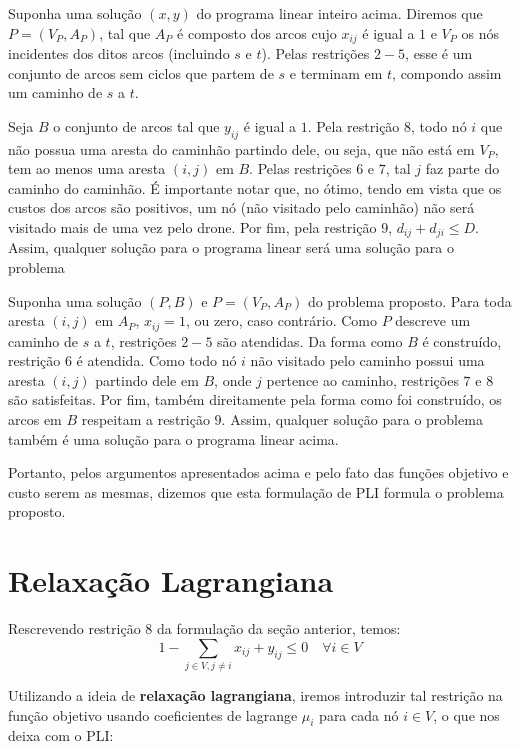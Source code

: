 \documentclass[11pt]{article}
\begin{document}
Suponha uma solução \((x,y)\) do programa linear inteiro acima. Diremos que \(P = (V_P, A_P)\), tal que \(A_P\) é composto dos arcos cujo \(x_{ij}\) é igual a \(1\) e \(V_P\) os nós incidentes dos ditos arcos (incluindo \(s\) e \(t\)). Pelas restrições \(2 - 5\), esse é um conjunto de arcos sem ciclos que partem de \(s\) e terminam em \(t\), compondo assim um caminho de \(s\) a \(t\).

Seja \(B\) o conjunto de arcos tal que \(y_{ij}\) é igual a \(1\). Pela restrição \(8\), todo nó \(i\) que não possua uma aresta do caminhão partindo dele, ou seja, que não está em \(V_P\), tem ao menos uma aresta \((i,j)\) em \(B\). Pelas restrições \(6\) e \(7\), tal \(j\) faz parte do caminho do caminhão. É importante notar que, no ótimo, tendo em vista que os custos dos arcos são positivos, um nó (não visitado pelo caminhão) não será visitado mais de uma vez pelo drone. Por fim, pela restrição \(9\), \(d_{ij} + d_{ji} \leq D\). Assim, qualquer solução para o programa linear será uma solução para o problema

Suponha uma solução \((P,B)\) e \(P = (V_P, A_P)\) do problema proposto. Para toda aresta \((i,j)\) em \(A_P\), \(x_{ij} = 1\), ou zero, caso contrário. Como \(P\) descreve um caminho de \(s\) a \(t\), restrições \(2-5\) são atendidas. Da forma como \(B\) é construído, restrição \(6\) é atendida. Como todo nó \(i\) não visitado pelo caminho possui uma aresta \((i,j)\) partindo dele em \(B\), onde \(j\) pertence ao caminho, restrições \(7\) e \(8\) são satisfeitas. Por fim, também direitamente pela forma como foi construído, os arcos em \(B\) respeitam a restrição \(9\). Assim, qualquer solução para o problema também é uma solução para o programa linear acima.

Portanto, pelos argumentos apresentados acima e pelo fato das funções objetivo e custo serem as mesmas, dizemos que esta formulação de PLI formula o problema proposto.

\section{Relaxação Lagrangiana}
\label{sec:org7699548}
Rescrevendo restrição \(8\) da formulação da seção anterior, temos:
$$
1 - \sum_{j \in V, j \neq i} x_{ij} + y_{ij} \leq 0 \quad \forall i \in V
$$

Utilizando a ideia de \textbf{relaxação lagrangiana}, iremos introduzir tal restrição na função objetivo usando coeficientes de lagrange \(\mu_i\) para cada nó \(i \in V\), o que nos deixa com o PLI:
\end{document}
